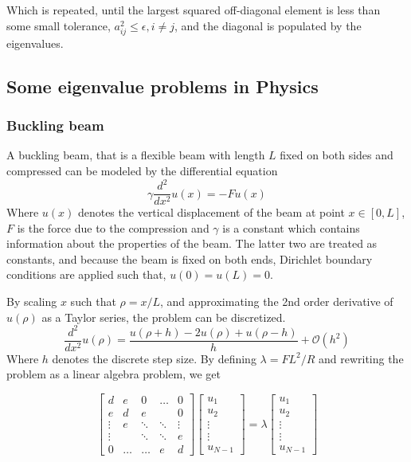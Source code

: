 \documentclass[10pt,showpacs,preprintnumbers,footinbib,amsmath,amssymb,aps,prl,twocolumn,groupedaddress,superscriptaddress,showkeys]{revtex4-1}
\begin{document}
Which is repeated, until the largest squared off-diagonal element is less than some small tolerance, $a_{ij}^2 \leq \epsilon, i\neq j$, and the diagonal is populated by the eigenvalues.

\subsection{Some eigenvalue problems in Physics}
  \subsubsection{Buckling beam}
    A buckling beam, that is a flexible beam with length $L$ fixed on both sides and compressed can be modeled by the differential equation 
    \begin{equation}
      \gamma \frac{d^2}{dx^2}u(x) = -Fu(x)
    \end{equation}
    Where $u(x)$ denotes the vertical displacement of the beam at point $x \in [0, L]$, $F$ is the force due to the compression and $\gamma$ is a constant which contains information about the properties of the beam. The latter two are treated as constants, and because the beam is fixed on both ends, Dirichlet boundary conditions are applied such that, $u(0) = u(L) = 0$.

    By scaling $x$ such that $\rho = x / L$, and approximating the 2nd order derivative of $u(\rho)$ as a Taylor series, the problem can be discretized.
    \begin{equation}
      \frac{d^2}{dx^2} u(\rho) = \frac{u(\rho + h) - 2u(\rho) + u(\rho - h)}{h} + \mathcal O(h^2)
    \end{equation}
    Where $h$ denotes the discrete step size. By defining $\lambda = FL^2 / R$ and rewriting the problem as a linear algebra problem, we get

    \begin{equation}
      \label{eqn:eigenval matrix}
      \begin{bmatrix}
        d & e & 0 & \dots & 0 \\
        e & d & e &  & 0 \\
        \vdots & e & \ddots & \ddots & \vdots \\
        \vdots &  & \ddots & \ddots & e \\
        0 & \dots & \dots &  e & d
      \end{bmatrix}
      \begin{bmatrix}
        u_1 \\ u_2 \\ \vdots \\ \vdots \\ u_{N-1}
      \end{bmatrix}
      =
      \lambda
      \begin{bmatrix}
        u_1 \\ u_2 \\ \vdots \\ \vdots \\ u_{N-1}
      \end{bmatrix}
    \end{equation}
\end{document}
